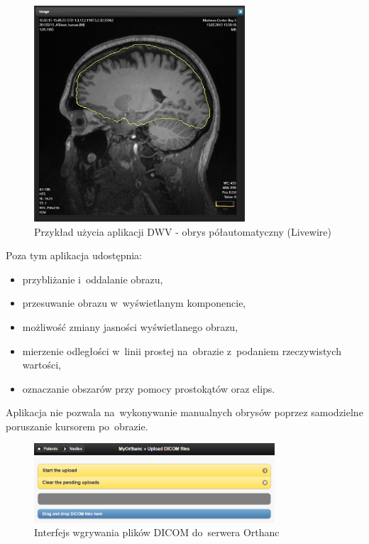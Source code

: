 \documentclass[a4paper,11pt,twoside,openright]{report}
\theoremstyle{definition}
\begin{document}
\begin{figure}[tb!]
	\center
	\includegraphics[width=0.7\textwidth]{DWV-interface}
	\caption{Przykład użycia aplikacji DWV - obrys półautomatyczny (Livewire)}
    	\label{fig:DWV-interface}
\end{figure}

 Poza tym aplikacja udostępnia:
\begin{itemize}[noitemsep]
\item przybliżanie i~oddalanie obrazu,
\item przesuwanie obrazu w~wyświetlanym komponencie,
\item możliwość zmiany jasności wyświetlanego obrazu,
\item mierzenie odległości w~linii prostej na~obrazie z~podaniem rzeczywistych wartości,
\item oznaczanie obszarów przy pomocy prostokątów oraz elips.
\end{itemize}

Aplikacja nie pozwala na~wykonywanie manualnych obrysów poprzez samodzielne
poruszanie kursorem po~obrazie.


\begin{figure}[tb!]
	\center
	\includegraphics[width=0.8\textwidth]{Orthanc-upload}
	\caption{Interfejs wgrywania plików DICOM do~serwera Orthanc}
    	\label{fig:Orthanc-upload}
\end{figure}
\end{document}
